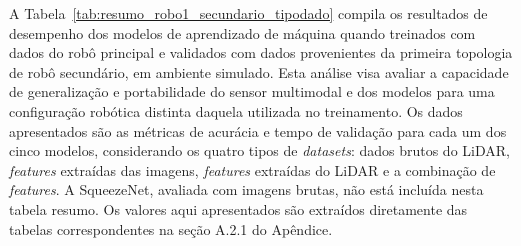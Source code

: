 A Tabela~\ref{tab:resumo_robo1_secundario_tipodado} compila os resultados de desempenho dos modelos de aprendizado de máquina quando treinados com dados do robô principal e validados com dados provenientes da primeira topologia de robô secundário, em ambiente simulado. Esta análise visa avaliar a capacidade de generalização e portabilidade do sensor multimodal e dos modelos para uma configuração robótica distinta daquela utilizada no treinamento. Os dados apresentados são as métricas de acurácia e tempo de validação para cada um dos cinco modelos, considerando os quatro tipos de \textit{datasets}: dados brutos do LiDAR, \textit{features} extraídas das imagens, \textit{features} extraídas do LiDAR e a combinação de \textit{features}. A SqueezeNet, avaliada com imagens brutas, não está incluída nesta tabela resumo. Os valores aqui apresentados são extraídos diretamente das tabelas correspondentes na seção A.2.1 do Apêndice.

